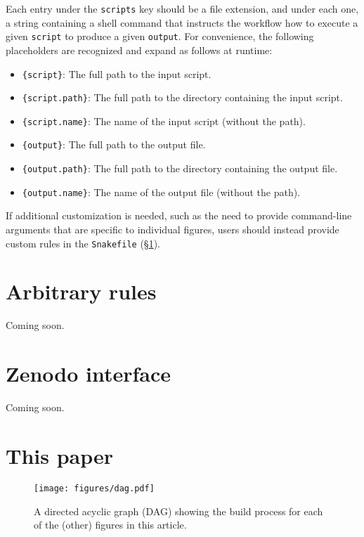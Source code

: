 \documentclass[twocolumn]{aastex631}
\begin{document}
\noindent Each entry under the \texttt{scripts} key should be a file extension, and under each one, a string containing a shell command that instructs the workflow how to execute a given {\color{lsthilite}\texttt{script}} to produce a given {\color{lsthilite}\texttt{output}}.
For convenience, the following placeholders are recognized and expand as follows at runtime:
%
\begin{itemize}
\item \texttt{\{script\}}: The full path to the input script.
\item \texttt{\{script.path\}}: The full path to the directory containing the input script.
\item \texttt{\{script.name\}}: The name of the input script (without the path).
\item \texttt{\{output\}}: The full path to the output file.
\item \texttt{\{output.path\}}: The full path to the directory containing the output file.
\item \texttt{\{output.name\}}: The name of the output file (without the path).
\end{itemize}
%
If additional customization is needed, such as the need to provide command-line arguments that are specific to individual figures, users should instead provide custom rules in the \texttt{Snakefile} (\S\ref{sec:arbitrary-rules}).

\section{Arbitrary rules}
\label{sec:arbitrary-rules}
%
Coming soon.

\section{Zenodo interface}
\label{sec:zenodo}
%
Coming soon.

\section{This paper}

\begin{figure}[ht!]
    \begin{centering}
        \texttt{[image: figures/dag.pdf]}
        \caption{
            A directed acyclic graph (DAG) showing the build process for each of the (other) figures in this article. 
        }
        \label{fig:dag}
    \end{centering}
\end{figure}


\end{document}
